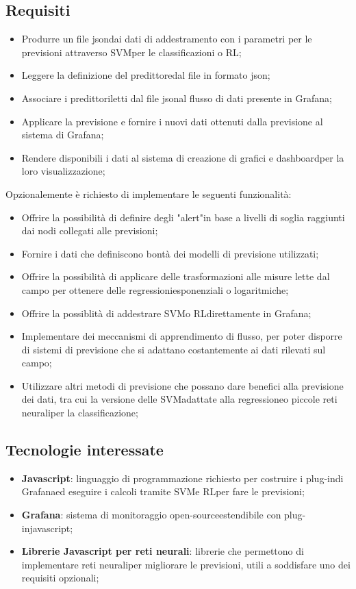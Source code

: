 \subsection{Requisiti}
\begin{itemize}
	\item Produrre un file json\glosp dai dati di addestramento con i parametri per le previsioni attraverso SVM\glosp per le classificazioni o RL\glo;
	\item Leggere la definizione del predittore\glosp dal file in formato json\glo;
	\item Associare i predittori\glosp letti dal file json\glosp al flusso di dati presente in Grafana\glo;
	\item Applicare la previsione e fornire i nuovi dati ottenuti dalla previsione al sistema di Grafana\glo;
	\item Rendere disponibili i dati al sistema di creazione di grafici e dashboard\glosp per la loro visualizzazione;
\end{itemize}
Opzionalemente è richiesto di implementare le seguenti funzionalità:
\begin{itemize}
	\item Offrire la possibilità di definire degli "alert"\glo in base a livelli di soglia raggiunti dai nodi collegati alle previsioni;
	\item Fornire i dati che definiscono bontà dei modelli di previsione utilizzati;
	\item Offrire la possibilità di applicare delle trasformazioni alle misure lette dal campo per ottenere delle regressioni\glosp esponenziali o logaritmiche;
	\item Offrire la possiblità di addestrare SVM\glosp o RL\glosp direttamente in Grafana\glo;
	\item Implementare dei meccanismi di apprendimento di flusso, per poter disporre di sistemi di previsione che si adattano costantemente ai dati rilevati sul campo;
	\item Utilizzare altri metodi di previsione che possano dare benefici alla previsione dei dati, tra cui la versione delle SVM\glosp adattate alla regressione\glosp o piccole reti neurali\glosp per la classificazione;
\end{itemize}

\subsection{Tecnologie interessate}
\begin{itemize}
	\item \textbf{Javascript}: linguaggio di programmazione richiesto per costruire i plug-in\glosp di Grafana\glosp ed eseguire i calcoli tramite SVM\glosp e RL\glosp per fare le previsioni;
	\item \textbf{Grafana}: sistema di monitoraggio open-source\glosp estendibile con plug-in\glosp javascript\glo;
	\item \textbf{Librerie Javascript per reti neurali}: librerie che permettono di implementare reti neurali\glosp per migliorare le previsioni, utili a soddisfare uno dei requisiti opzionali;
\end{itemize}

